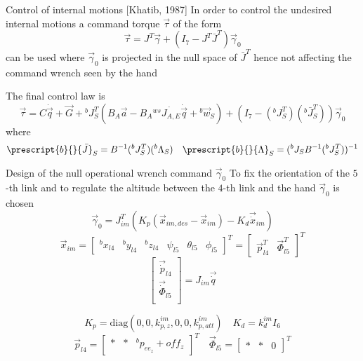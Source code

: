 \begin{frame}{Control of internal motions [Khatib, 1987]}
 In order to control the undesired internal motions a command torque $\vec{\tau}$ of the form
 \[
 \vec{\tau} = J^{T} \vec{\gamma} + (I_7 - J^{T}\bar{J}^{T}) \vec{\gamma}_{0}
 \]
 can be used where $\vec{\gamma}_{0}$ is projected in the null space of $\bar{J}^{T}$ hence not affecting
 the command wrench seen by the hand
 \par
 The final control law is
 \[
 \vec{\tau} = C \dot{\vec{q}} + \vec{G} + {}^{b}J^{T}_{S} ( B_A \vec{a} - B_A {}^{ws} \dot{J_{A,E}} \dot{\vec{q}} + {}^b\vec{w}_{S}) +
 (I_7 - ({}^{b}J^{T}_{S}) ({}^{b} \bar{J}^{T}_{S})) \vec{\gamma}_{0}
 \]
where
\[
\prescript{b}{}{\bar{J}}_{S} = B^{-1} ({}^{b} J^{T}_{S}) ({}^{b} \Lambda_{S}) \quad 
\prescript{b}{}{\Lambda}_{S} = ({}^{b} J_{S} B^{-1} ({}^{b} J^{T}_{S}))^{-1}
\]
\end{frame}

\begin{frame}{Design of the null operational wrench command $\vec{\gamma}_{0}$}
  To fix the orientation of the $5$-th link and
  to regulate the altitude between the $4$-th link and the hand 
  $\vec{\gamma}_0$ is chosen
  \[
  \vec{\gamma}_{0} = J_{im} ^{T} (K_p (\vec{x}_{im,des} - \vec{x}_{im} ) - K_d \vec{\dot{x}}_{im})
  \]
  \[
  \vec{x}_{im} =
  \begin{bmatrix}
    {}^{b} x_{l4} & {}^{b} y_{l4} & {}^{b} z_{l4} & \psi_{l5} & \theta_{l5} & \phi_{l5}
  \end{bmatrix}^{T} =
  \begin{bmatrix}
    \vec{p}^{T}_{l4} & \vec{\Phi}^{T}_{l5}
  \end{bmatrix}^{T}
  \]
  \[
  \begin{bmatrix}
  \vec{\dot{p}}_{l4} \\
  \vec{\dot{\Phi}}_{l5} \\
  \end{bmatrix} =
  J_{im} \vec{\dot{q}}
  \]
  \par
  \[
  K_p = \text{diag}(0, 0, k_{p,z}^{im}, 0, 0, k_{p, att}^{im})
  \quad
  K_d = k_{d}^{im} I_{6}
  \]
  \[
  \vec{p}_{l4} =
  \begin{bmatrix}
    * & * & {}^{b} p_{ee_{z}} + off_z
  \end{bmatrix}^{T}
  \quad
  \vec{\Phi}_{l5} =
  \begin{bmatrix}
    * & * & 0
  \end{bmatrix}^{T}
  \]
\end{frame}
